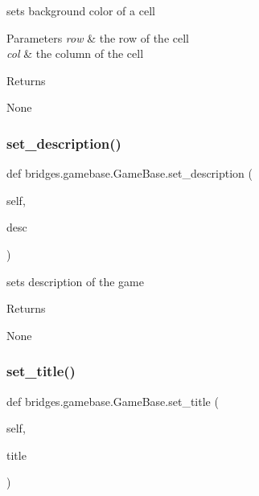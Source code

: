 sets background color of a cell 


\begin{DoxyParams}{Parameters}
{\em row} & the row of the cell \\
\hline
{\em col} & the column of the cell\\
\hline
\end{DoxyParams}
\begin{DoxyReturn}{Returns}


None 
\end{DoxyReturn}
\mbox{\label{classbridges_1_1gamebase_1_1_game_base_a75ecd56daf08036207772d6ce81c90b1}} 
\subsubsection{\texorpdfstring{set\+\_\+description()}{set\_description()}}
{\footnotesize\ttfamily def bridges.\+gamebase.\+Game\+Base.\+set\+\_\+description (\begin{DoxyParamCaption}\item[{}]{self,  }\item[{}]{desc }\end{DoxyParamCaption})}



sets description of the game 

\begin{DoxyReturn}{Returns}


None 
\end{DoxyReturn}
\mbox{\label{classbridges_1_1gamebase_1_1_game_base_a7e7d4033c4b191b3699dbf0cb5f25933}} 
\subsubsection{\texorpdfstring{set\+\_\+title()}{set\_title()}}
{\footnotesize\ttfamily def bridges.\+gamebase.\+Game\+Base.\+set\+\_\+title (\begin{DoxyParamCaption}\item[{}]{self,  }\item[{}]{title }\end{DoxyParamCaption})}



